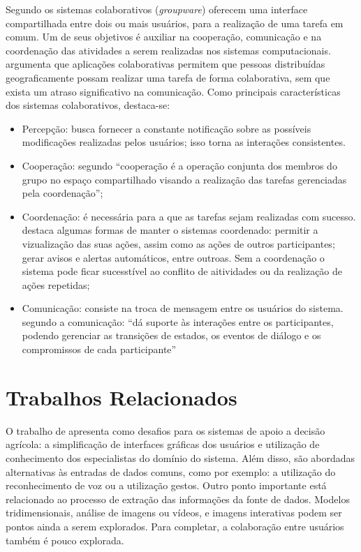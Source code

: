 \documentclass[12pt]{article}
\begin{document}
Segundo  os sistemas colaborativos (\textit{groupware}) oferecem uma interface compartilhada entre dois ou mais usuários, para a realização de uma tarefa em comum. Um de seus objetivos é auxiliar na cooperação, comunicação e na coordenação das atividades a serem realizadas nos sistemas computacionais.  argumenta que aplicações colaborativas permitem que pessoas distribuídas geograficamente possam realizar uma tarefa de forma colaborativa, sem que exista um atraso significativo na comunicação. Como principais características dos sistemas colaborativos, destaca-se:

\begin{itemize}
	\item Percepção: busca fornecer a constante notificação sobre as possíveis modificações realizadas pelos usuários; isso torna as interações consistentes.
	\item Cooperação: segundo \cite{Fuks:2003} ``cooperação é a operação conjunta dos membros do grupo no espaço compartilhado visando a realização das tarefas gerenciadas pela coordenação'';
	\item Coordenação: é necessária para a que as tarefas sejam realizadas com sucesso.  destaca algumas formas de manter o sistemas coordenado: permitir a vizualização das suas ações, assim como as ações de outros participantes; gerar avisos e alertas automáticos, entre outroas. Sem a coordenação o sistema pode ficar sucesstível ao conflito de aitividades ou da realização de ações repetidas;
	\item Comunicação: consiste na troca de mensagem entre os usuários do sistema. segundo \cite{Fuks:2003} a comunicação: ``dá suporte às interações entre os participantes, podendo gerenciar as transições de estados, os eventos de diálogo e os compromissos de cada participante''
\end{itemize}

\section{Trabalhos Relacionados}
\label{sec:trabalhos_relacionados}

O trabalho de  apresenta como desafios para os sistemas de apoio a decisão agrícola: a simplificação de interfaces gráficas dos usuários e utilização de conhecimento dos especialistas do domínio do sistema. Além disso, são abordadas alternativas às entradas de dados comuns, como por exemplo: a utilização do reconhecimento de voz ou a utilização gestos. Outro ponto importante está relacionado ao processo de extração das informações da fonte de dados. Modelos tridimensionais, análise de imagens ou vídeos, e imagens interativas podem ser pontos ainda a serem explorados. Para completar, a colaboração entre usuários também é pouco explorada.
\end{document}
